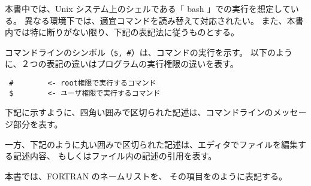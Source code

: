 
本書中では、Unix システム上のシェルである「 bash 」での実行を想定している。
異なる環境下では、適宜コマンドを読み替えて対応されたい。
また、本書内では特に断りがない限り、下記の表記法に従うものとする。

コマンドラインのシンボル（\verb|$, #|）は、コマンドの実行を示す。
以下のように、２つの表記の違いはプログラムの実行権限の違いを表す。

\begin{verbatim}
 #        <- root権限で実行するコマンド
 $        <- ユーザ権限で実行するコマンド
\end{verbatim}


下記に示すように、四角い囲みで区切られた記述は、コマンドラインのメッセージ部分を表す。\\

一方、下記のように丸い囲みで区切られた記述は、エディタでファイルを編集する記述内容、
もしくはファイル内の記述の引用を表す。\\

本書では、FORTRAN のネームリストを、
その項目をのように表記する。
